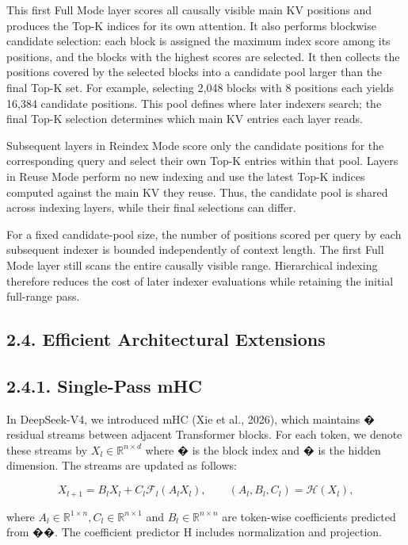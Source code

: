 \documentclass[
  10
]{article}
\begin{document}
This first Full Mode layer scores all causally visible main KV positions
and produces the Top-K indices for its own attention. It also performs
blockwise candidate selection: each block is assigned the maximum index
score among its positions, and the blocks with the highest scores are
selected. It then collects the positions covered by the selected blocks
into a candidate pool larger than the final Top-K set. For example,
selecting 2,048 blocks with 8 positions each yields 16,384 candidate
positions. This pool defines where later indexers search; the final
Top-K selection determines which main KV entries each layer reads.

Subsequent layers in Reindex Mode score only the candidate positions for
the corresponding query and select their own Top-K entries within that
pool. Layers in Reuse Mode perform no new indexing and use the latest
Top-K indices computed against the main KV they reuse. Thus, the
candidate pool is shared across indexing layers, while their final
selections can differ.

For a fixed candidate-pool size, the number of positions scored per
query by each subsequent indexer is bounded independently of context
length. The first Full Mode layer still scans the entire causally
visible range. Hierarchical indexing therefore reduces the cost of later
indexer evaluations while retaining the initial full-range pass.

\subsection{2.4. Efficient Architectural
Extensions}\label{efficient-architectural-extensions}

\subsection{2.4.1. Single-Pass mHC}\label{single-pass-mhc}

In DeepSeek-V4, we introduced mHC (Xie et al., 2026), which maintains �
residual streams between adjacent Transformer blocks. For each token, we
denote these streams by \(X _ { l } \in \mathbb { R } ^ { n \times d }\)
where � is the block index and � is the hidden dimension. The streams
are updated as follows:

\[
X _ {l + 1} = B _ {l} X _ {l} + C _ {l} \mathcal {F} _ {l} (A _ {l} X _ {l}), \qquad (A _ {l}, B _ {l}, C _ {l}) = \mathcal {H} (X _ {l}),\tag{2}
\]

where
\(A _ { l } \in \mathbb { R } ^ { 1 \times n } , C _ { l } \in \mathbb { R } ^ { n \times 1 }\)
and \(B _ { l } \in \mathbb { R } ^ { n \times n }\) are token-wise
coefficients predicted from ��. The coefficient predictor H includes
normalization and projection.
\end{document}
